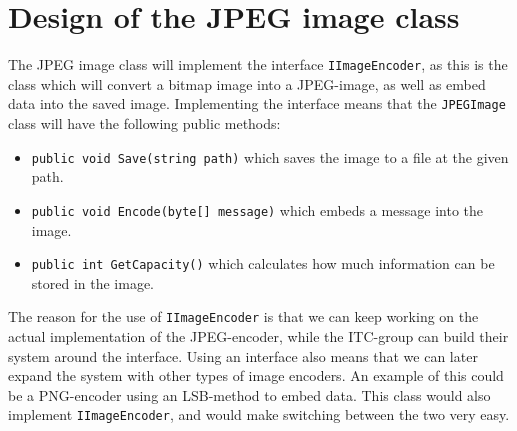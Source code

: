 \section{Design of the JPEG image class}

The JPEG image class will implement the interface \lstinline|IImageEncoder|, as this is the class which will convert a bitmap image into a JPEG-image, as well as embed data into the saved image.
Implementing the interface means that the \lstinline|JPEGImage| class will have the following public methods:

\begin{itemize}
	\item \lstinline|public void Save(string path)| which saves the image to a file at the given path.
	\item \lstinline|public void Encode(byte[] message)| which embeds a message into the image.
	\item \lstinline|public int GetCapacity()| which calculates how much information can be stored in the image. 
\end{itemize}

The reason for the use of \lstinline|IImageEncoder| is that we can keep working on the actual implementation of the JPEG-encoder, while the ITC-group can build their system around the interface.
Using an interface also means that we can later expand the system with other types of image encoders.
An example of this could be a PNG-encoder using an LSB-method to embed data.
This class would also implement \lstinline|IImageEncoder|, and would make switching between the two very easy. 
